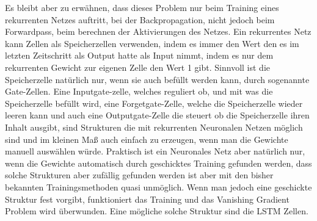 Es bleibt aber zu erwähnen, dass dieses Problem nur beim Training eines rekurrenten Netzes auftritt, bei der Backpropagation, nicht jedoch beim Forwardpass, beim berechnen der Aktivierungen des Netzes. Ein rekurrentes Netz kann Zellen als Speicherzellen verwenden, indem es immer den Wert den es im letzten Zeitschritt als Output hatte als Input nimmt, indem es nur dem rekurrenten Gewicht zur eigenen Zelle den Wert 1 gibt. Sinnvoll ist die Speicherzelle natürlich nur, wenn sie auch befüllt werden kann, durch sogenannte Gate-Zellen. Eine Inputgate-zelle, welches reguliert ob, und mit was die Speicherzelle befüllt wird, eine Forgetgate-Zelle, welche die Speicherzelle wieder leeren kann und auch eine Outputgate-Zelle die steuert ob die Speicherzelle ihren Inhalt ausgibt, sind Strukturen die mit rekurrenten Neuronalen Netzen möglich sind und im kleinen Maß auch einfach zu erzeugen, wenn man die Gewichte manuell auswählen würde. Praktisch ist ein Neuronales Netz aber natürlich nur, wenn die Gewichte automatisch durch geschicktes Training gefunden werden, dass solche Strukturen aber zufällig gefunden werden ist aber mit den bisher bekannten Trainingsmethoden quasi unmöglich. Wenn man jedoch eine geschickte Struktur fest vorgibt, funktioniert das Training und das Vanishing Gradient Problem wird überwunden. Eine mögliche solche Struktur sind die LSTM Zellen. 
